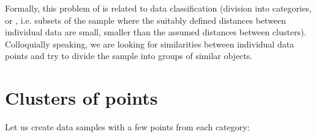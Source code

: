 \documentclass[letterpaper,10pt,english]{jupyterBook}
\begin{document}
\sphinxAtStartPar
Formally, this problem of  is related to data classification (division into categories, or , i.e. subsets of the sample where the suitably defined distances between individual data are small, smaller than the assumed distances between clusters). Colloquially speaking, we are looking for similarities between individual data points and try to divide the sample into groups of similar objects.


\section{Clusters of points}
\label{\detokenize{docs/unsupervised:clusters-of-points}}
\begin{sphinxVerbatim}[commandchars=\\\{\}]
 
     \PYG{p}{[}   \PYG{p}{]} 

 
     \PYG{p}{[}   \PYG{p}{]} 

 
     \PYG{p}{[}   \PYG{p}{]} 

 
     \PYG{p}{[}   \PYG{p}{]} 
\end{sphinxVerbatim}

\sphinxAtStartPar
Let us create data samples with a few points from each category:
\end{document}
